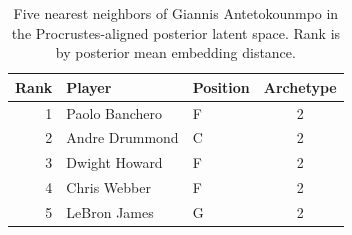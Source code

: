 \begin{table}[htbp]
  \centering\small
  \begin{tabular}{rllc}
    \toprule
    Rank & Player & Position & Archetype \\
    \midrule
    1 & Paolo Banchero & F & 2 \\
    2 & Andre Drummond & C & 2 \\
    3 & Dwight Howard & F & 2 \\
    4 & Chris Webber & F & 2 \\
    5 & LeBron James & G & 2 \\
    \bottomrule
  \end{tabular}
  \caption{Five nearest neighbors of Giannis Antetokounmpo in the Procrustes-aligned posterior latent space. Rank is by posterior mean embedding distance.}
  \label{tab:Giannis_Antetokounmpo_neighbors}
\end{table}

